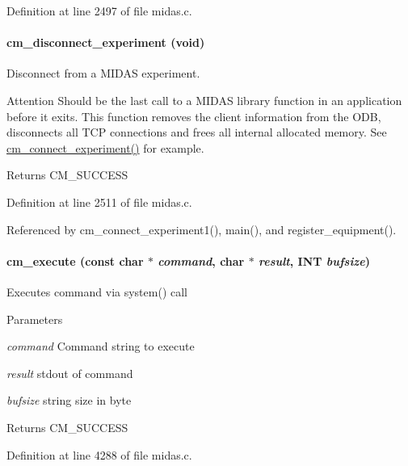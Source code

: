 Definition at line 2497 of file midas.c.
\paragraph[{cm\_\-disconnect\_\-experiment}]{ cm\_\-disconnect\_\-experiment (void)}\hfill\label{group__cmfunctionc_ga7d5a287821786e8dde3d2340826215b2}
Disconnect from a MIDAS experiment. \begin{DoxyAttention}{Attention}
Should be the last call to a MIDAS library function in an application before it exits. This function removes the client information from the ODB, disconnects all TCP connections and frees all internal allocated memory. See \hyperlink{group__cmfunctionc_ga1e96495bb5b89e4ea770a1ea7bc7787b}{cm\_\-connect\_\-experiment()} for example. 
\end{DoxyAttention}
\begin{DoxyReturn}{Returns}
CM\_\-SUCCESS 
\end{DoxyReturn}


Definition at line 2511 of file midas.c.

Referenced by cm\_\-connect\_\-experiment1(), main(), and register\_\-equipment().
\paragraph[{cm\_\-execute}]{ cm\_\-execute (const char $\ast$ {\em command}, \/  char $\ast$ {\em result}, \/  {\bf INT} {\em bufsize})}\hfill\label{group__cmfunctionc_ga609631cf55247d2e58069bae08419a86}
Executes command via system() call 
\begin{DoxyParams}{Parameters}
\item[{\em command}]Command string to execute \item[{\em result}]stdout of command \item[{\em bufsize}]string size in byte \end{DoxyParams}
\begin{DoxyReturn}{Returns}
CM\_\-SUCCESS 
\end{DoxyReturn}


Definition at line 4288 of file midas.c.
